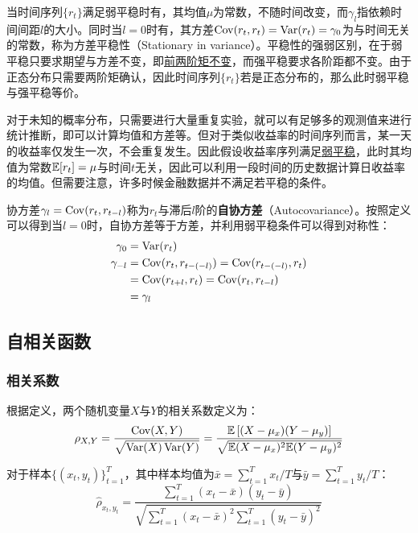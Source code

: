 \documentclass[11pt]{article}
\begin{document}
当时间序列$\{r_t\}$满足弱平稳时有，其均值$\mu$为常数，不随时间改变，而$\gamma_l$指依赖时间间距$l$的大小。同时当$l=0$时有，其方差$\operatorname{Cov}(r_t,r_t) = \operatorname{Var}(r_t) = \gamma_0$为与时间无关的常数，称为方差平稳性（Stationary in variance）。平稳性的强弱区别，在于弱平稳只要求期望与方差不变，即\uline{前两阶矩不变}，而强平稳要求各阶距都不变。由于正态分布只需要两阶矩确认，因此时间序列$\{r_t\}$若是正态分布的，那么此时弱平稳与强平稳等价。

对于未知的概率分布，只需要进行大量重复实验，就可以有足够多的观测值来进行统计推断，即可以计算均值和方差等。但对于类似收益率的时间序列而言，某一天的收益率仅发生一次，不会重复发生。因此假设收益率序列满足\uline{弱平稳}，此时其均值为常数$\mathbb{E}[r_t] = \mu$与时间$t$无关，因此可以利用一段时间的历史数据计算日收益率的均值。但需要注意，许多时候金融数据并不满足若平稳的条件。

协方差$\gamma_l = \operatorname{Cov}(r_t,r_{t-l})$称为$r_t$与滞后$l$阶的\textbf{自协方差}（Autocovariance）。按照定义可以得到当$l=0$时，自协方差等于方差，并利用弱平稳条件可以得到对称性：
\begin{align*}
    \gamma_0 &= \operatorname{Var}(r_t) \\
    \gamma_{-l} &= \operatorname{Cov}(r_{t},r_{t-(-l)}) = \operatorname{Cov}(r_{t-(-l)},r_{t}) \\
    &= \operatorname{Cov}(r_{t+l},r_{t}) = \operatorname{Cov}(r_{t},r_{t-l}) \\
    &= \gamma_{l}
\end{align*}

\subsection{自相关函数}

\subsubsection{相关系数}

根据定义，两个随机变量$X$与$Y$的相关系数定义为：
\begin{equation*}
    \rho_{X,Y} = \frac{\operatorname{Cov}(X,Y)}{\sqrt{\operatorname{Var}(X)\operatorname{Var}(Y)}}
    = \frac{\mathbb{E}\left[(X-\mu_x)(Y-\mu_y)\right]}{\sqrt{\mathbb{E}(X-\mu_x)^2 \mathbb{E}(Y-\mu_y)^2}}
\end{equation*}

对于样本$\{(x_t,y_t)\}_{t=1}^{T}$，其中样本均值为$\bar{x}=\sum_{t=1}^{T}x_t/T$与$\bar{y}=\sum_{t=1}^{T}y_t/T$：
\begin{equation*}
    \hat{\rho}_{x_t,y_t} = \frac{\sum_{t=1}^{T}(x_t-\bar{x})(y_t-\bar{y})}{\sqrt{\sum_{t=1}^{T}(x_t-\bar{x})^2 \sum_{t=1}^{T}(y_t-\bar{y})^2}}
\end{equation*}
\end{document}
